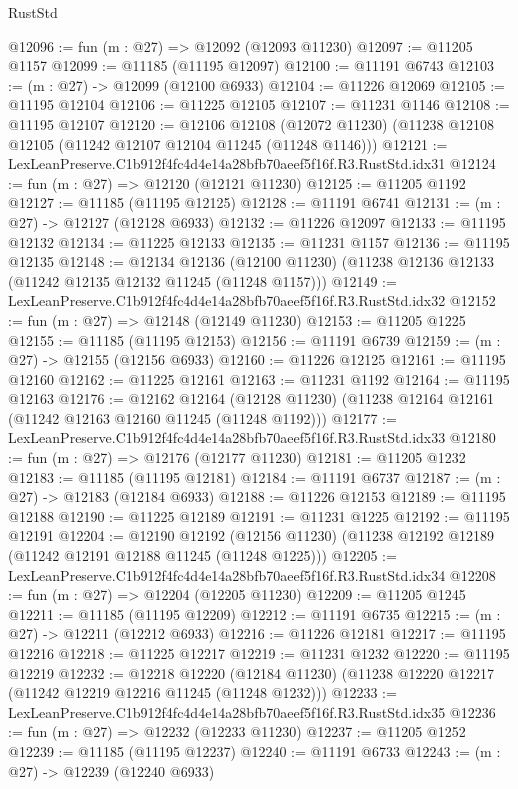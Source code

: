 \begin{lexlean}{RustStd}
\begin{coremodule}
@12096 := fun (m : @27) => @12092 (@12093 @11230)
@12097 := @11205 @1157
@12099 := @11185 (@11195 @12097)
@12100 := @11191 @6743
@12103 := (m : @27) -> @12099 (@12100 @6933)
@12104 := @11226 @12069
@12105 := @11195 @12104
@12106 := @11225 @12105
@12107 := @11231 @1146
@12108 := @11195 @12107
@12120 := @12106
    @12108
    (@12072 @11230)
    (@11238 @12108 @12105 (@11242 @12107 @12104 @11245 (@11248 @1146)))
@12121 := LexLeanPreserve.C1b912f4fc4d4e14a28bfb70aeef5f16f.R3.RustStd.idx31
@12124 := fun (m : @27) => @12120 (@12121 @11230)
@12125 := @11205 @1192
@12127 := @11185 (@11195 @12125)
@12128 := @11191 @6741
@12131 := (m : @27) -> @12127 (@12128 @6933)
@12132 := @11226 @12097
@12133 := @11195 @12132
@12134 := @11225 @12133
@12135 := @11231 @1157
@12136 := @11195 @12135
@12148 := @12134
    @12136
    (@12100 @11230)
    (@11238 @12136 @12133 (@11242 @12135 @12132 @11245 (@11248 @1157)))
@12149 := LexLeanPreserve.C1b912f4fc4d4e14a28bfb70aeef5f16f.R3.RustStd.idx32
@12152 := fun (m : @27) => @12148 (@12149 @11230)
@12153 := @11205 @1225
@12155 := @11185 (@11195 @12153)
@12156 := @11191 @6739
@12159 := (m : @27) -> @12155 (@12156 @6933)
@12160 := @11226 @12125
@12161 := @11195 @12160
@12162 := @11225 @12161
@12163 := @11231 @1192
@12164 := @11195 @12163
@12176 := @12162
    @12164
    (@12128 @11230)
    (@11238 @12164 @12161 (@11242 @12163 @12160 @11245 (@11248 @1192)))
@12177 := LexLeanPreserve.C1b912f4fc4d4e14a28bfb70aeef5f16f.R3.RustStd.idx33
@12180 := fun (m : @27) => @12176 (@12177 @11230)
@12181 := @11205 @1232
@12183 := @11185 (@11195 @12181)
@12184 := @11191 @6737
@12187 := (m : @27) -> @12183 (@12184 @6933)
@12188 := @11226 @12153
@12189 := @11195 @12188
@12190 := @11225 @12189
@12191 := @11231 @1225
@12192 := @11195 @12191
@12204 := @12190
    @12192
    (@12156 @11230)
    (@11238 @12192 @12189 (@11242 @12191 @12188 @11245 (@11248 @1225)))
@12205 := LexLeanPreserve.C1b912f4fc4d4e14a28bfb70aeef5f16f.R3.RustStd.idx34
@12208 := fun (m : @27) => @12204 (@12205 @11230)
@12209 := @11205 @1245
@12211 := @11185 (@11195 @12209)
@12212 := @11191 @6735
@12215 := (m : @27) -> @12211 (@12212 @6933)
@12216 := @11226 @12181
@12217 := @11195 @12216
@12218 := @11225 @12217
@12219 := @11231 @1232
@12220 := @11195 @12219
@12232 := @12218
    @12220
    (@12184 @11230)
    (@11238 @12220 @12217 (@11242 @12219 @12216 @11245 (@11248 @1232)))
@12233 := LexLeanPreserve.C1b912f4fc4d4e14a28bfb70aeef5f16f.R3.RustStd.idx35
@12236 := fun (m : @27) => @12232 (@12233 @11230)
@12237 := @11205 @1252
@12239 := @11185 (@11195 @12237)
@12240 := @11191 @6733
@12243 := (m : @27) -> @12239 (@12240 @6933)

\end{coremodule}
\end{lexlean}
